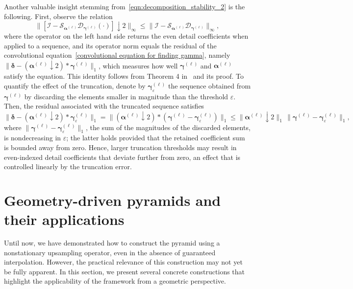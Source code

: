\documentclass[11pt,a4paper]{article}
\theoremstyle{definition}
\begin{document}
Another valuable insight stemming from~\eqref{eqn:decomposition_stability_2} is the following. First, observe the relation
\begin{equation*}
    \|[\mathcal{I}-\mathcal{S}_{\boldsymbol{\alpha}^{(\ell)}}\mathcal{D}_{\boldsymbol{\gamma}^{(\ell)}}(\cdot)]\downarrow 2\|_\infty \leq \|\mathcal{I}-\mathcal{S}_{\boldsymbol{\alpha}^{(\ell)}}\mathcal{D}_{\boldsymbol{\gamma}^{(\ell)}}\|_\infty,
\end{equation*}
where the operator on the left hand side returns the even detail coefficients when applied to a sequence, and its operator norm equals the residual of the convolutional equation~\eqref{convolutional equation for finding gamma}, namely $\|\boldsymbol{\delta}-(\boldsymbol{\alpha}^{(\ell)}\downarrow2)*\boldsymbol{\gamma}^{(\ell)}\|_1$, which measures how well $\boldsymbol{\gamma}^{(\ell)}$ and $\boldsymbol{\alpha}^{(\ell)}$ satisfy the equation. This identity follows from Theorem 4 in~\cite{dyn2021linear} and its proof. To quantify the effect of the truncation, denote by $\boldsymbol{\gamma}^{(\ell)}_\varepsilon$ the sequence obtained from $\boldsymbol{\gamma}^{(\ell)}$ by discarding the elements smaller in magnitude than the threshold $\varepsilon$. Then, the residual associated with the truncated sequence satisfies
\begin{equation*}
    \|\boldsymbol{\delta}-(\boldsymbol{\alpha}^{(\ell)}\downarrow2)*\boldsymbol{\gamma}^{(\ell)}_\varepsilon\|_1 = \|(\boldsymbol{\alpha}^{(\ell)}\downarrow2)*(\boldsymbol{\gamma}^{(\ell)}-\boldsymbol{\gamma}^{(\ell)}_\varepsilon)\|_1 \leq \|\boldsymbol{\alpha}^{(\ell)}\downarrow2\|_1\,\|\boldsymbol{\gamma}^{(\ell)}-\boldsymbol{\gamma}^{(\ell)}_\varepsilon\|_1,
\end{equation*}
where $\|\boldsymbol{\gamma}^{(\ell)}-\boldsymbol{\gamma}^{(\ell)}_\varepsilon\|_1$, the sum of the magnitudes of the discarded elements, is nondecreasing in $\varepsilon$; the latter holds provided that the retained coefficient sum is bounded away from zero. Hence, larger truncation thresholds may result in even-indexed detail coefficients that deviate further from zero, an effect that is controlled linearly by the truncation error.

\section{Geometry-driven pyramids and their applications} \label{sec:geom}

Until now, we have demonstrated how to construct the pyramid using a nonstationary upsampling operator, even in the absence of guaranteed interpolation. However, the practical relevance of this construction may not yet be fully apparent. In this section, we present several concrete constructions that highlight the applicability of the framework from a geometric perspective.
\end{document}
